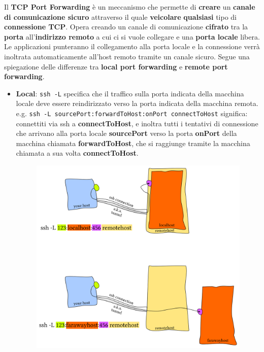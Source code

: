 \documentclass[11pt,a4paper]{article}
\theoremstyle{definition}
\begin{document}
Il \textbf{TCP Port Forwarding} è un meccanismo che permette di \textbf{creare} un \textbf{canale di comunicazione sicuro} attraverso il quale \textbf{veicolare} \textbf{qualsiasi} tipo di \textbf{connessione TCP}. Opera creando un canale di comunicazione \textbf{cifrato} tra la \textbf{porta} all’\textbf{indirizzo remoto} a cui ci si vuole collegare e una \textbf{porta locale} libera. Le applicazioni punteranno il collegamento alla porta locale e la connessione verrà inoltrata automaticamente all’host remoto
tramite un canale sicuro. \newline Segue una spiegazione delle differenze tra \textbf{local port forwarding} e \textbf{remote port forwarding}.
\newpage
\begin{itemize}
	\item \textbf{Local}: \texttt{ssh -L} specifica che il traffico sulla porta indicata della macchina locale deve essere reindirizzato verso la porta indicata della macchina remota. \newline
	      e.g. \texttt{ssh -L sourcePort:forwardToHost:onPort connectToHost} significa: connettiti via ssh a \textbf{connectToHost}, e inoltra tutti i tentativi di connessione che arrivano alla porta locale \textbf{sourcePort} verso la porta \textbf{onPort} della macchina chiamata \textbf{forwardToHost}, che si raggiunge tramite la macchina chiamata a sua volta \textbf{connectToHost}.
	      \begin{figure}[!h]
		      \includegraphics[scale=0.8]{Immagini/Local_ssh.png}

\end{figure}
\end{itemize}
\end{document}
